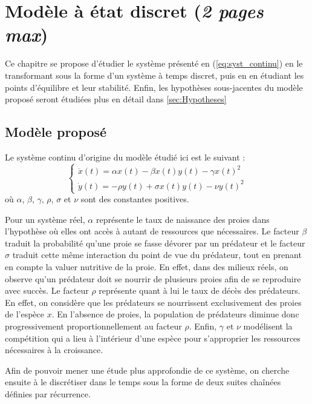 \chapter{Modèle à état discret (\textit{2 pages max})}
\label{ch:modele_discret}

Ce chapitre se propose d'étudier le système présenté en (\ref{eq:syst_continu}) en le transformant sous la forme d'un système à temps discret, puis en en étudiant les points d'équilibre et leur stabilité. Enfin, les hypothèses sous-jacentes du modèle proposé seront étudiées plus en détail dans \ref{sec:Hypotheses}

\section{Modèle proposé}

Le système continu d'origine du modèle étudié ici est le suivant :
\begin{equation}
    \label{eq:syst_continu}
    \begin{cases}
        \dot{x}(t) = \alpha x(t) - \beta x(t) y(t) - \gamma x(t)^2 \\
        \dot{y}(t) = - \rho y(t) + \sigma x(t) y(t) - \nu y(t)^2
    \end{cases}
\end{equation}
où $\alpha$, $\beta$, $\gamma$, $\rho$, $\sigma$ et $\nu$ sont des constantes positives.

Pour un système réel, $\alpha$ représente le taux de naissance des proies dans l'hypothèse où elles ont accès à autant de ressources que nécessaires.
Le facteur $\beta$ traduit la probabilité qu'une proie se fasse dévorer par un prédateur et le facteur $\sigma$ traduit cette même interaction du point de vue du prédateur, tout en prenant en compte la valuer nutritive de la proie. En effet, dans des milieux réels, on observe qu'un prédateur doit se nourrir de plusieurs proies afin de se reproduire avec succès.
Le facteur $\rho$ représente quant à lui le taux de décès des prédateurs. En effet, on considère que les prédateurs se nourrissent exclusivement des proies de l'espèce $x$. En l'absence de proies, la population de prédateurs diminue donc progressivement proportionnellement au facteur $\rho$.
Enfin, $\gamma$ et $\nu$ modélisent la compétition qui a lieu à l'intérieur d'une espèce pour s'approprier les ressources nécessaires à la croissance.

Afin de pouvoir mener une étude plus approfondie de ce système, on cherche ensuite à le discrétiser dans le temps sous la forme de deux suites chaînées définies par récurrence.


